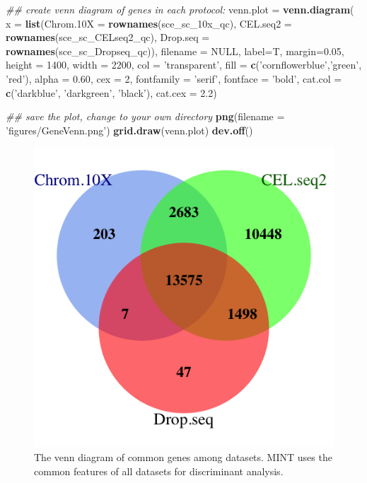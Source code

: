 \documentclass[]{book}
\newenvironment{Shaded}{\begin{snugshade}}{\end{snugshade}}
\newcommand{\CommentTok}[1]{\textcolor[rgb]{0.56,0.35,0.01}{\textit{#1}}}
\newcommand{\DataTypeTok}[1]{\textcolor[rgb]{0.13,0.29,0.53}{#1}}
\newcommand{\DecValTok}[1]{\textcolor[rgb]{0.00,0.00,0.81}{#1}}
\newcommand{\FloatTok}[1]{\textcolor[rgb]{0.00,0.00,0.81}{#1}}
\newcommand{\KeywordTok}[1]{\textcolor[rgb]{0.13,0.29,0.53}{\textbf{#1}}}
\newcommand{\NormalTok}[1]{#1}
\newcommand{\OtherTok}[1]{\textcolor[rgb]{0.56,0.35,0.01}{#1}}
\newcommand{\StringTok}[1]{\textcolor[rgb]{0.31,0.60,0.02}{#1}}
\theoremstyle{definition}
\theoremstyle{definition}
\theoremstyle{definition}
\theoremstyle{remark}
\begin{document}
\begin{Shaded}
\begin{Highlighting}[]
\CommentTok{## create venn diagram of genes in each protocol:}
\NormalTok{venn.plot =}\StringTok{ }\KeywordTok{venn.diagram}\NormalTok{(}
  \DataTypeTok{x =} \KeywordTok{list}\NormalTok{(}\DataTypeTok{Chrom.10X =} \KeywordTok{rownames}\NormalTok{(sce_sc_10x_qc),}
           \DataTypeTok{CEL.seq2 =} \KeywordTok{rownames}\NormalTok{(sce_sc_CELseq2_qc),}
           \DataTypeTok{Drop.seq =} \KeywordTok{rownames}\NormalTok{(sce_sc_Dropseq_qc)),}
  \DataTypeTok{filename =} \OtherTok{NULL}\NormalTok{, }\DataTypeTok{label=}\NormalTok{T, }\DataTypeTok{margin=}\FloatTok{0.05}\NormalTok{,}
  \DataTypeTok{height =} \DecValTok{1400}\NormalTok{, }\DataTypeTok{width =} \DecValTok{2200}\NormalTok{,}
  \DataTypeTok{col =} \StringTok{'transparent'}\NormalTok{, }\DataTypeTok{fill =} \KeywordTok{c}\NormalTok{(}\StringTok{'cornflowerblue'}\NormalTok{,}\StringTok{'green'}\NormalTok{, }\StringTok{'red'}\NormalTok{),}
  \DataTypeTok{alpha =} \FloatTok{0.60}\NormalTok{, }\DataTypeTok{cex =} \DecValTok{2}\NormalTok{, }\DataTypeTok{fontfamily =} \StringTok{'serif'}\NormalTok{, }\DataTypeTok{fontface =} \StringTok{'bold'}\NormalTok{,}
  \DataTypeTok{cat.col =} \KeywordTok{c}\NormalTok{(}\StringTok{'darkblue'}\NormalTok{, }\StringTok{'darkgreen'}\NormalTok{, }\StringTok{'black'}\NormalTok{), }\DataTypeTok{cat.cex =} \FloatTok{2.2}\NormalTok{)}

\CommentTok{## save the plot, change to your own directory}
\KeywordTok{png}\NormalTok{(}\DataTypeTok{filename =} \StringTok{'figures/GeneVenn.png'}\NormalTok{)}
\KeywordTok{grid.draw}\NormalTok{(venn.plot)}
\KeywordTok{dev.off}\NormalTok{()}
\end{Highlighting}
\end{Shaded}

\begin{figure}[ht]

{\centering \includegraphics[width=0.4\linewidth]{figures/GeneVenn} 

}

\caption{ The venn diagram of common genes among datasets. MINT uses the common features of all datasets for discriminant analysis.}\label{fig:unnamed-chunk-12}
\end{figure}
\end{document}
